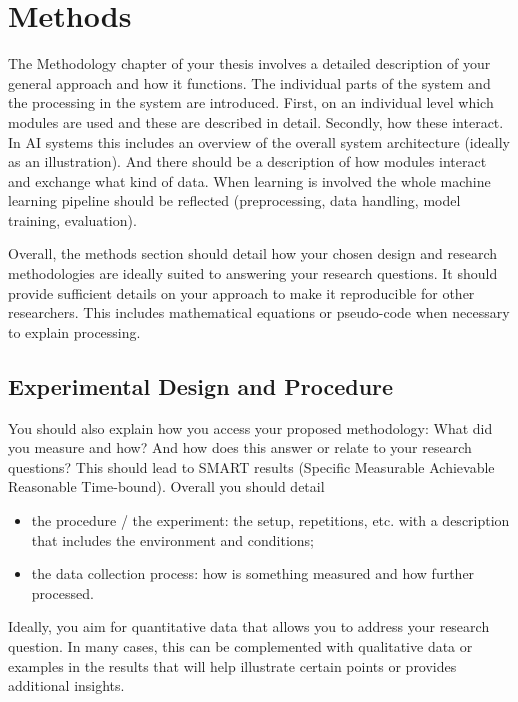 \chapter{Methods}
\label{ch:methods}

The Methodology chapter of your thesis  involves a detailed description of your general approach and how it functions. The individual parts of the system and the processing in the system are introduced. First, on an individual level which modules are used and these are described in detail. Secondly, how these interact. In AI systems this includes an overview of the overall system architecture (ideally as an illustration). And there should be a description of how modules interact and exchange what kind of data. When learning is involved the whole machine learning pipeline should be reflected (preprocessing, data handling, model training, evaluation).

Overall, the methods section should detail how your chosen design and research methodologies are ideally suited to answering your research questions. It should provide sufficient details on your approach to make it reproducible for other researchers. This includes mathematical equations or pseudo-code when necessary to explain processing.

\section{Experimental Design and Procedure}
\label{s:experimental_design}

You should also explain how you access your proposed methodology: What did you measure and how? And how does this answer or relate to your research questions? This should lead to SMART results (Specific Measurable Achievable Reasonable Time-bound). Overall you should detail 

\begin{itemize}
\item the procedure / the experiment: the setup, repetitions, etc. with a description that includes the environment and conditions;
\item the data collection process: how is something measured and how further processed.
\end{itemize}

Ideally, you aim for quantitative data that allows you to address your research question. In many cases, this can be complemented with qualitative data or examples in the results that will help illustrate certain points or provides additional insights.

